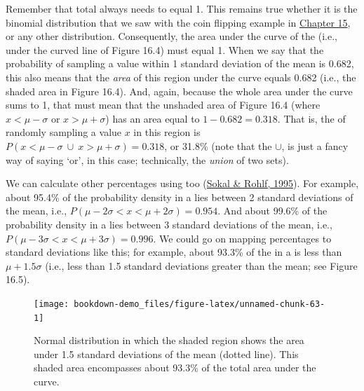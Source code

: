 \documentclass[
  openany]{krantz}
\begin{document}
Remember that total  always needs to equal 1.
This remains true whether it is the binomial distribution that we saw with the coin flipping example in \protect\hyperlink{Chapter_15}{Chapter 15}, or any other distribution.
Consequently, the area under the curve of the  (i.e., under the curved line of Figure 16.4) must equal 1.
When we say that the probability of sampling a value within 1 standard deviation of the mean is 0.682, this also means that the \emph{area} of this region under the curve equals 0.682 (i.e., the shaded area in Figure 16.4).
And, again, because the whole area under the curve sums to 1, that must mean that the unshaded area of Figure 16.4 (where \(x < \mu -\sigma\) or \(x > \mu + \sigma\)) has an area equal to \(1 - 0.682 = 0.318\).
That is, the  of randomly sampling a value \(x\) in this region is \(P(x < \mu - \sigma \: \cup \: x > \mu + \sigma) = 0.318\), or 31.8\% (note that the \(\cup\), is just a fancy way of saying `or', in this case; technically, the \emph{union} of two sets).

We can calculate other percentages using  too (\protect\hyperlink{ref-Sokal1995}{Sokal \& Rohlf, 1995}).
For example, about 95.4\% of the probability density in a  lies between 2 standard deviations of the mean, i.e., \(P(\mu - 2\sigma < x < \mu + 2\sigma) = 0.954\).
And about 99.6\% of the probability density in a  lies between 3 standard deviations of the mean, i.e., \(P(\mu - 3\sigma < x < \mu + 3\sigma) = 0.996\).
We could go on mapping percentages to standard deviations like this; for example, about 93.3\% of the  in a  is less than \(\mu + 1.5\sigma\) (i.e., less than 1.5 standard deviations greater than the mean; see Figure 16.5).

\begin{figure}
\texttt{[image: bookdown-demo\_files/figure-latex/unnamed-chunk-63-1]} \caption{Normal distribution in which the shaded region shows the area under 1.5 standard deviations of the mean (dotted line). This shaded area encompasses about 93.3\% of the total area under the curve.}\label{fig:unnamed-chunk-63}
\end{figure}

\newpage
\end{document}
